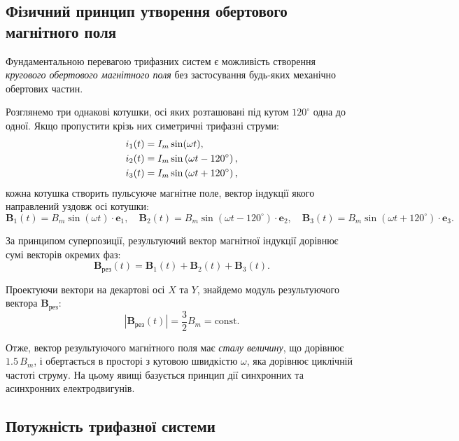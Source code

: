 \documentclass[]{ConspectBook}
\begin{document}
\subsection*{Фізичний принцип утворення обертового магнітного поля}

Фундаментальною перевагою трифазних систем є можливість створення \emph{кругового обертового магнітного поля} без застосування будь-яких механічно обертових частин.

Розглянемо три однакові котушки, осі яких розташовані під кутом $120^\circ$ одна до одної. Якщо пропустити крізь них симетричні трифазні струми:
\begin{align}
	i_1(t) &= I_m \sin(\omega t), \notag \\
	i_2(t) &= I_m \sin\left(\omega t - 120^\circ\right), \\
	i_3(t) &= I_m \sin\left(\omega t + 120^\circ\right), \notag
\end{align}
кожна котушка створить пульсуюче магнітне поле, вектор індукції якого направлений уздовж осі котушки:
\begin{equation}
	\mathbf{B}_1(t) = B_m \sin(\omega t) \cdot \mathbf{e}_1, \quad \mathbf{B}_2(t) = B_m \sin(\omega t - 120^\circ) \cdot \mathbf{e}_2, \quad \mathbf{B}_3(t) = B_m \sin(\omega t + 120^\circ) \cdot \mathbf{e}_3.
\end{equation}

За принципом суперпозиції, результуючий вектор магнітної індукції дорівнює сумі векторів окремих фаз:
\begin{equation}
	\mathbf{B}_{\text{рез}}(t) = \mathbf{B}_1(t) + \mathbf{B}_2(t) + \mathbf{B}_3(t).
\end{equation}

Проектуючи вектори на декартові осі $X$ та $Y$, знайдемо модуль результуючого вектора $\mathbf{B}_{\text{рез}}$:
\begin{equation}
	|\mathbf{B}_{\text{рез}}(t)| = \frac{3}{2} B_m = \text{const}.
\end{equation}

Отже, вектор результуючого магнітного поля має \emph{сталу величину}, що дорівнює $1.5\,B_m$, і обертається в просторі з кутовою швидкістю $\omega$, яка дорівнює циклічній частоті струму. На цьому явищі базується принцип дії синхронних та асинхронних електродвигунів.

\subsection*{Потужність трифазної системи}
\end{document}

